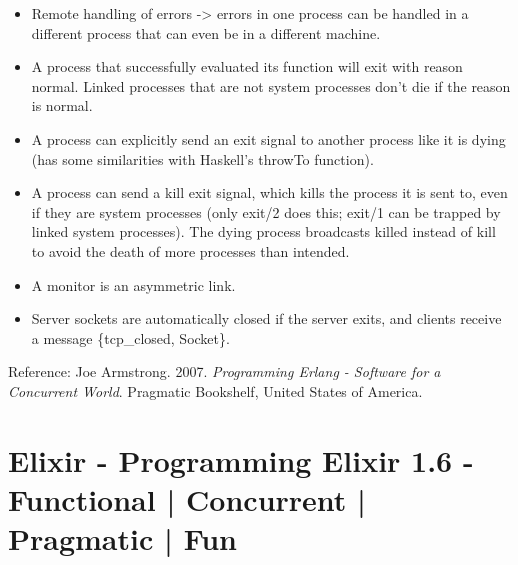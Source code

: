 \documentclass[a4paper,11pt]{article}
\theoremstyle{plain}
\theoremstyle{nonumberplain}
\begin{document}
\begin{itemize}
  \item Remote handling of errors -> errors in one process can be handled in a different process that can even be in a different machine.
  \item A process that successfully evaluated its function will exit with reason normal. Linked processes that are not system processes don't die if the reason is normal.
  \item A process can explicitly send an exit signal to another process like it is dying (has some similarities with Haskell's throwTo function).
  \item A process can send a kill exit signal, which kills the process it is sent to, even if they are system processes (only exit/2 does this; exit/1 can be trapped by linked system processes). The dying process broadcasts killed instead of kill to avoid the death of more processes than intended.
  \item A monitor is an asymmetric link.
  \item Server sockets are automatically closed if the server exits, and clients receive a message \{tcp\_closed, Socket\}.
\end{itemize}

Reference: Joe Armstrong. 2007. \textit{Programming Erlang - Software for a Concurrent World}. Pragmatic Bookshelf, United States of America.

\section{Elixir - Programming Elixir 1.6 - Functional | Concurrent | Pragmatic | Fun}
\end{document}
